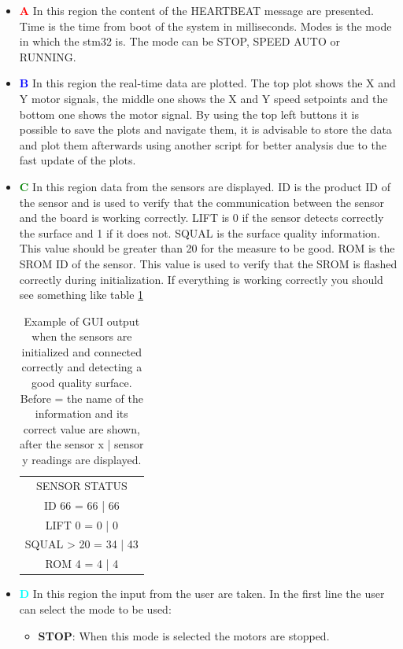 \documentclass[12pt,a4paper, twoside]{article}
\begin{document}
\begin{itemize}
	\item \textcolor{red}{\textbf{A}} In this region the content of the HEARTBEAT message are presented. Time is the time from boot of the system in milliseconds. Modes is the mode in which the stm32 is. The mode can be STOP, SPEED AUTO or RUNNING.
	\item \textcolor{blue}{\textbf{B}} In this region the real-time data are plotted. The top plot shows the X and Y motor signals, the middle one shows the X and Y speed setpoints and the bottom one shows the motor signal. By using the top left buttons it is possible to save the plots and navigate them, it is advisable to store the data and plot them afterwards using another script for better analysis due to the fast update of the plots.
	\item \textcolor{green}{\textbf{C}} In this region data from the sensors are displayed. ID is the product ID of the sensor and is used to verify that the communication between the sensor and the board is working correctly. LIFT is 0 if the sensor detects correctly the surface and 1 if it does not. SQUAL is the surface quality information. This value should be greater than 20 for the measure to be good. ROM is the SROM ID of the sensor. This value is used to verify that the SROM is flashed correctly during initialization. If everything is working correctly you should see something like table \ref{tab:sens_corr}
	\begin{table}[H]
		\centering
		\begin{tabular}{|c|} 
			\hline
			SENSOR STATUS\\ 
			ID 66 = 66 | 66\\
			LIFT 0 = 0 | 0\\
			SQUAL > 20 = 34 | 43\\
			ROM 4 = 4 | 4\\
			\hline
		\end{tabular} 
		\caption[Correct sensor status]{Example of GUI output when the sensors are initialized and connected correctly and detecting a good quality surface. Before = the name of the information and its correct value are shown, after the sensor x | sensor y readings are displayed.}
		\label{tab:sens_corr}
	\end{table}
	\item \textcolor{cyan}{\textbf{D}} 
	In this region the input from the user are taken. In the first line the user can select the mode to be used:
	\begin{itemize}
		\item \textbf{STOP}: When this mode is selected the motors are stopped.

\end{itemize}
\end{itemize}
\end{document}
